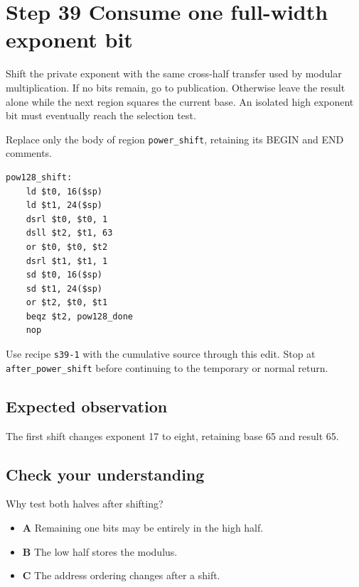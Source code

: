 \section{Step 39 Consume one full-width exponent bit}\label{rsa-s39}

Shift the private exponent with the same cross-half transfer used by modular multiplication. If no bits remain, go to publication. Otherwise leave the result alone while the next region squares the current base. An isolated high exponent bit must eventually reach the selection test.

Replace only the body of region \texttt{power\_shift}, retaining its BEGIN and END comments.

\begin{verbatim}
pow128_shift:
    ld $t0, 16($sp)
    ld $t1, 24($sp)
    dsrl $t0, $t0, 1
    dsll $t2, $t1, 63
    or $t0, $t0, $t2
    dsrl $t1, $t1, 1
    sd $t0, 16($sp)
    sd $t1, 24($sp)
    or $t2, $t0, $t1
    beqz $t2, pow128_done
    nop
\end{verbatim}

Use recipe \texttt{s39-1} with the cumulative source through this edit. Stop at \texttt{after\_power\_shift} before continuing to the temporary or normal return.

\subsection{Expected observation}
The first shift changes exponent 17 to eight, retaining base 65 and result 65.

\subsection{Check your understanding}
Why test both halves after shifting?

\begin{itemize}
  \item \textbf{A} Remaining one bits may be entirely in the high half.
  \item \textbf{B} The low half stores the modulus.
  \item \textbf{C} The address ordering changes after a shift.
\end{itemize}
